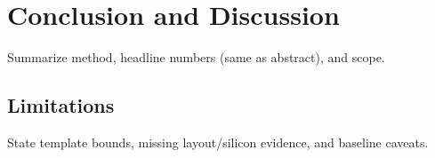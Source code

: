 \section{Conclusion and Discussion}
\label{sec:conclusion}

Summarize method, headline numbers (same as abstract), and scope.

\subsection{Limitations}
State template bounds, missing layout/silicon evidence, and baseline caveats.
